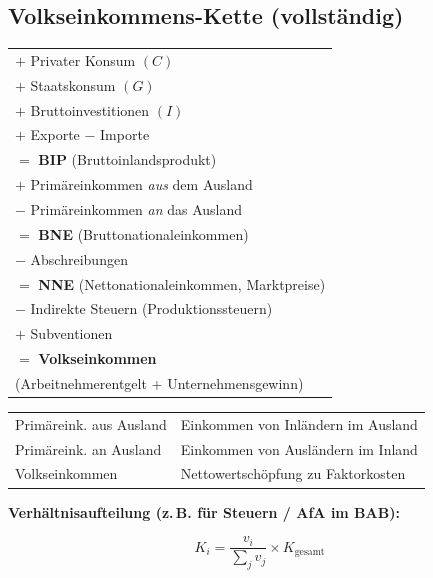 \documentclass[10pt,a4paper]{article}
\begin{document}
\vspace{4pt}

\begin{multicols}{2}

\subsection{Volkseinkommens-Kette (vollständig)}

\begin{vwlbox}
\renewcommand{\arraystretch}{1.2}
\begin{tabular}{@{}l@{}}
$+$ Privater Konsum $(C)$ \\
$+$ Staatskonsum $(G)$ \\
$+$ Bruttoinvestitionen $(I)$ \\
$+$ Exporte $-$ Importe \\
\hline
$=$ \textbf{BIP} (Bruttoinlandsprodukt) \\[3pt]
$+$ Primäreinkommen \textit{aus} dem Ausland \\
$-$ Primäreinkommen \textit{an} das Ausland \\
\hline
$=$ \textbf{BNE} (Bruttonationaleinkommen) \\[3pt]
$-$ Abschreibungen \\
\hline
$=$ \textbf{NNE} (Nettonationaleinkommen, Marktpreise) \\[3pt]
$-$ Indirekte Steuern (Produktionssteuern) \\
$+$ Subventionen \\
\hline
$=$ \textbf{Volkseinkommen} \\
\quad (Arbeitnehmerentgelt + Unternehmensgewinn) \\
\end{tabular}
\end{vwlbox}

\begin{tabular}{|L{2.8cm}|L{4.2cm}|}
\hline
{}
Primäreink. aus Ausland & Einkommen von Inländern im Ausland \\
Primäreink. an Ausland & Einkommen von Ausländern im Inland \\
Volkseinkommen & Nettowertschöpfung zu Faktorkosten \\
\hline
\end{tabular}

\vspace{4pt}
\textbf{Verhältnisaufteilung (z.\,B. für Steuern / AfA im BAB):}

\begin{formelbox}
\[
K_i = \frac{v_i}{\displaystyle\sum_j v_j} \times K_{\text{gesamt}}
\]
\end{formelbox}


\end{multicols}
\end{document}
